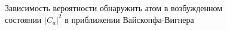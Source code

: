 \begin{figure}
\centering



\caption{Зависимость вероятности обнаружить атом в возбужденном
  состоянии $\left|C_{a}\right|^2$ в приближении Вайскопфа-Вигнера}
\label{fig:part1:vaickopf}
\end{figure}
